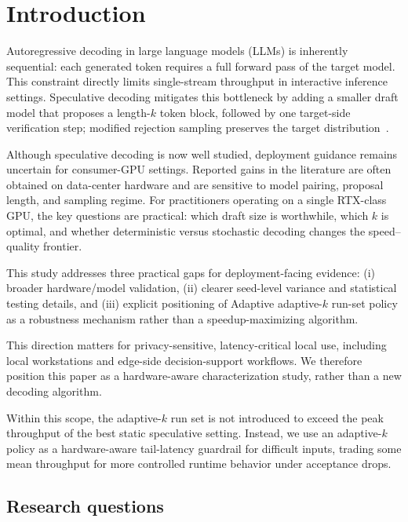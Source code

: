 \section{Introduction}

Autoregressive decoding in large language models (LLMs) is inherently
sequential: each generated token requires a full forward pass of the target
model. This constraint directly limits single-stream throughput in interactive
inference settings. Speculative decoding mitigates this bottleneck by adding a
smaller draft model that proposes a length-$k$ token block, followed by one
target-side verification step; modified rejection sampling preserves the target
distribution~\cite{Leviathan2023, Chen2023specsampling}.

Although speculative decoding is now well studied, deployment guidance remains
uncertain for consumer-GPU settings. Reported gains in the literature are often
obtained on data-center hardware and are sensitive to model pairing, proposal
length, and sampling regime. For practitioners operating on a single RTX-class
GPU, the key questions are practical: which draft size is worthwhile, which
$k$ is optimal, and whether deterministic versus stochastic decoding changes
the speed--quality frontier.

This study addresses three practical gaps for deployment-facing evidence:
(i) broader hardware/model validation, (ii) clearer seed-level variance and
statistical testing details, and (iii) explicit positioning of Adaptive
adaptive-$k$ run-set policy as a robustness mechanism rather than a
speedup-maximizing algorithm.

This direction matters for privacy-sensitive, latency-critical local use,
including local workstations and edge-side decision-support workflows. We
therefore position this paper as a hardware-aware characterization study,
rather than a new decoding algorithm.

Within this scope, the adaptive-$k$ run set is not introduced to exceed the
peak throughput of the best static speculative setting. Instead, we use an
adaptive-$k$ policy as a hardware-aware tail-latency guardrail for difficult
inputs, trading some mean throughput for more controlled runtime behavior under
acceptance drops.

\subsection{Research questions}
\label{sec:rqs}

